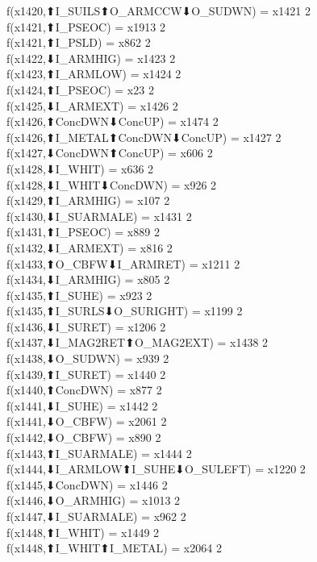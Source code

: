f(x1420,⬆I_SUILS⬆O_ARMCCW⬇O_SUDWN) = x1421 {2} \\
f(x1421,⬆I_PSEOC) = x1913 {2} \\
f(x1421,⬆I_PSLD) = x862 {2} \\
f(x1422,⬇I_ARMHIG) = x1423 {2} \\
f(x1423,⬆I_ARMLOW) = x1424 {2} \\
f(x1424,⬆I_PSEOC) = x23 {2} \\
f(x1425,⬇I_ARMEXT) = x1426 {2} \\
f(x1426,⬆ConcDWN⬇ConcUP) = x1474 {2} \\
f(x1426,⬆I_METAL⬆ConcDWN⬇ConcUP) = x1427 {2} \\
f(x1427,⬇ConcDWN⬆ConcUP) = x606 {2} \\
f(x1428,⬇I_WHIT) = x636 {2} \\
f(x1428,⬇I_WHIT⬇ConcDWN) = x926 {2} \\
f(x1429,⬆I_ARMHIG) = x107 {2} \\
f(x1430,⬇I_SUARMALE) = x1431 {2} \\
f(x1431,⬆I_PSEOC) = x889 {2} \\
f(x1432,⬇I_ARMEXT) = x816 {2} \\
f(x1433,⬆O_CBFW⬇I_ARMRET) = x1211 {2} \\
f(x1434,⬇I_ARMHIG) = x805 {2} \\
f(x1435,⬆I_SUHE) = x923 {2} \\
f(x1435,⬆I_SURLS⬇O_SURIGHT) = x1199 {2} \\
f(x1436,⬇I_SURET) = x1206 {2} \\
f(x1437,⬇I_MAG2RET⬆O_MAG2EXT) = x1438 {2} \\
f(x1438,⬇O_SUDWN) = x939 {2} \\
f(x1439,⬆I_SURET) = x1440 {2} \\
f(x1440,⬆ConcDWN) = x877 {2} \\
f(x1441,⬇I_SUHE) = x1442 {2} \\
f(x1441,⬇O_CBFW) = x2061 {2} \\
f(x1442,⬇O_CBFW) = x890 {2} \\
f(x1443,⬆I_SUARMALE) = x1444 {2} \\
f(x1444,⬇I_ARMLOW⬆I_SUHE⬇O_SULEFT) = x1220 {2} \\
f(x1445,⬇ConcDWN) = x1446 {2} \\
f(x1446,⬇O_ARMHIG) = x1013 {2} \\
f(x1447,⬇I_SUARMALE) = x962 {2} \\
f(x1448,⬆I_WHIT) = x1449 {2} \\
f(x1448,⬆I_WHIT⬆I_METAL) = x2064 {2} \\
